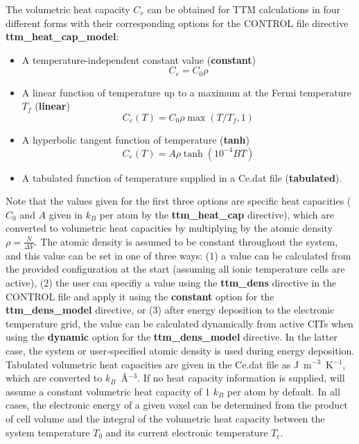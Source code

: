 The volumetric heat capacity $C_e$
can be obtained for TTM calculations in four different forms with their
corresponding options for the CONTROL file directive {\bf ttm\_heat\_cap\_model}:
\begin{itemize}
\item A temperature-independent constant value ({\bf constant})\begin{equation*}C_e = C_0 \rho\end{equation*}
\item A linear function of temperature up to a maximum at the Fermi temperature $T_{f}$ ({\bf linear}) \begin{equation*}C_e (T) = C_0 \rho \max \left(T/T_{f}, 1\right)\end{equation*}
\item A hyperbolic tangent function of temperature ({\bf tanh}) \begin{equation*}C_e (T) = A \rho \tanh \left(10^{-4} B T\right)\end{equation*}
\item A tabulated function of temperature supplied in a Ce.dat file  ({\bf tabulated}).
\end{itemize}
Note that the values given for the first three options are specific heat
capacities ($C_0$ and $A$ given in $k_B$ per atom by 
the {\bf ttm\_heat\_cap} directive), which are converted to volumetric 
heat capacities by multiplying by the atomic density $\rho = \frac{N}{\Delta V}$. 
The atomic density is assumed to be constant throughout the system, and 
this value can be set in one of three ways: (1) a value can be calculated 
from the provided configuration at the start (assuming all ionic temperature 
cells are active), (2) the user can specifiy a value using the {\bf ttm\_dens} 
directive in the CONTROL file and apply it using the {\bf constant} option
for the {\bf ttm\_dens\_model} directive, or (3) after energy deposition 
to the electronic temperature grid, the value can be calculated dynamically 
from active CITs when using the {\bf dynamic} option for the {\bf ttm\_dens\_model}
directive. In the latter case, the system or user-specified atomic density is
used during energy deposition. Tabulated volumetric heat capacities are
given in the Ce.dat file as J~m$^{-3}$~K$^{-1}$, which are converted to
$k_B$~\AA$^{-3}$. If no heat capacity information is supplied, \D will
assume a constant volumetric heat capacity of 1 $k_B$ per atom by
default. In all cases, the electronic energy of a given voxel can be
determined from the product of cell volume and the integral of the
volumetric heat capacity between the system temperature $T_0$
and its current electronic temperature $T_e$.

